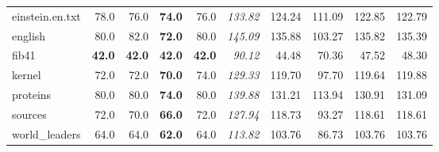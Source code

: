 \documentclass[10pt,a4paper]{standalone}
\begin{document}
\begin{tabular}{|l|r|r|r|r|r|r|r|r|r|}
  einstein.en.txt &          78.0 &          76.0 & \textbf{74.0} &          76.0 & \emph{133.82} & 124.24 & 111.09 & 122.85 & 122.79 \\
          english &          80.0 &          82.0 & \textbf{72.0} &          80.0 & \emph{145.09} & 135.88 & 103.27 & 135.82 & 135.39 \\
            fib41 & \textbf{42.0} & \textbf{42.0} & \textbf{42.0} & \textbf{42.0} & \emph{90.12} & 44.48 & 70.36 & 47.52 & 48.30 \\
           kernel &          72.0 &          72.0 & \textbf{70.0} &          74.0 & \emph{129.33} & 119.70 & 97.70 & 119.64 & 119.88 \\
         proteins &          80.0 &          80.0 & \textbf{74.0} &          80.0 & \emph{139.88} & 131.21 & 113.94 & 130.91 & 131.09 \\
          sources &          72.0 &          70.0 & \textbf{66.0} &          72.0 & \emph{127.94} & 118.73 & 93.27 & 118.61 & 118.61 \\
   world\_leaders &          64.0 &          64.0 & \textbf{62.0} &          64.0 & \emph{113.82} & 103.76 & 86.73 & 103.76 & 103.76 \\
\hline
\end{tabular}
\end{document}
